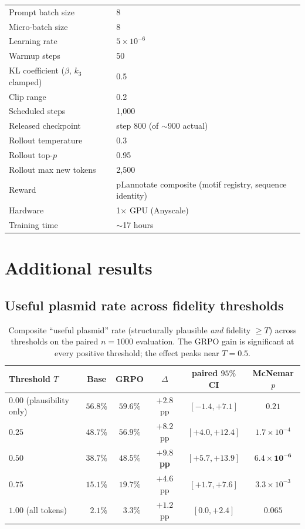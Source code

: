 \documentclass{article}
\begin{document}
\begin{table}[h]
\begin{tabular}{ll}
    Prompt batch size & 8 \\
    Micro-batch size & 8 \\
    Learning rate & $5 \times 10^{-6}$ \\
    Warmup steps & 50 \\
    KL coefficient ($\beta$, $k_3$ clamped) & 0.5 \\
    Clip range & 0.2 \\
    Scheduled steps & 1,000 \\
    Released checkpoint & step 800 (of $\sim$900 actual) \\
    Rollout temperature & 0.3 \\
    Rollout top-$p$ & 0.95 \\
    Rollout max new tokens & 2,500 \\
    Reward & pLannotate composite (motif registry, sequence identity) \\
    Hardware & 1$\times$ GPU (Anyscale) \\
    Training time & $\sim$17 hours \\
    \bottomrule
  \end{tabular}
\end{table}

\section{Additional results}
\label{app:results}

\subsection{Useful plasmid rate across fidelity thresholds}

\begin{table}[h]
  \caption{Composite ``useful plasmid'' rate (structurally plausible \emph{and} fidelity
    $\geq T$) across thresholds on the paired $n=1000$ evaluation. The GRPO gain is
  significant at every positive threshold; the effect peaks near $T=0.5$.}
  \label{tab:useful}
  \centering
  \small
  \begin{tabular}{lcccc|c}
    \toprule
    Threshold $T$ & Base & GRPO & $\Delta$ & paired $95\%$ CI & McNemar $p$ \\
    \midrule
    $0.00$ (plausibility only)         & $56.8\%$ & $59.6\%$ & $+2.8$ pp & $[-1.4, +7.1]$
    & $0.21$ \\
    $0.25$                              & $48.7\%$ & $56.9\%$ & $+8.2$ pp & $[+4.0,
    +12.4]$ & $1.7\times 10^{-4}$ \\
    $\mathbf{0.50}$                     & $\mathbf{38.7\%}$ & $\mathbf{48.5\%}$ &
    $\mathbf{+9.8}$ \textbf{pp} & $\mathbf{[+5.7, +13.9]}$ & $\mathbf{6.4\times 10^{-6}}$ \\
    $0.75$                              & $15.1\%$ & $19.7\%$ & $+4.6$ pp & $[+1.7,
    +7.6]$ & $3.3\times 10^{-3}$ \\
    $1.00$ (all tokens)                 & $\phantom{0}2.1\%$ & $\phantom{0}3.3\%$ &
    $+1.2$ pp & $[0.0, +2.4]$ & $0.065$ \\
    \bottomrule
  \end{tabular}
\end{table}
\end{document}
